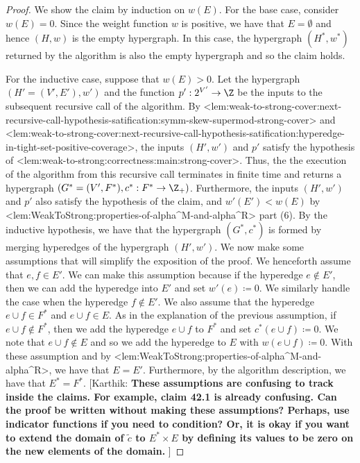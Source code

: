 \documentclass{article}
\def\Cref#1{<#1>}%
\newcommand{\knote}[1]{{\color{red}[{\tiny Karthik: \bf #1}]\marginpar{\color{red}*}}}
\begin{document}
\iffalse
\begin{proof}
    We show the claim by induction on $w(E)$. For the base case, consider $w(E) = 0$. Since the weight function $w$ is positive, we have that $E = \emptyset$ and hence $(H, w)$ is the empty hypergraph. In this case, the hypergraph $(H^*, w^*)$ returned by the algorithm is also the empty hypergraph and so the claim holds. 

    For the inductive case, suppose that $w(E) > 0$. Let the hypergraph $(H' = (V', E'), w')$ and the function $p':2^{V'}\rightarrow\Z$ be the inputs to the subsequent recursive call of the algorithm. By \Cref{lem:weak-to-strong-cover:next-recursive-call-hypothesis-satification:symm-skew-supermod-strong-cover} and \Cref{lem:weak-to-strong-cover:next-recursive-call-hypothesis-satification:hyperedge-in-tight-set-positive-coverage}, the inputs $(H',w')$ and $p'$ satisfy the hypothesis of \Cref{lem:weak-to-strong:correctness:main:strong-cover}. Thus, the the execution of the algorithm from this recursive call terminates in finite time and returns a hypergraph $(G^* = (V', F^*), c^*:F^*\rightarrow\Z_+)$. Furthermore, the inputs 
$(H', w')$ and $p'$ also satisfy the hypothesis of the claim, and $w'(E') < w(E)$ by \Cref{lem:WeakToStrong:properties-of-alpha^M-and-alpha^R} part (6). By the inductive hypothesis, we have that the hypergraph $(G^*, c^*)$ is formed by merging hyperedges of the hypergraph $(H', w')$. We now make some assumptions that will simplify the exposition of the proof. We henceforth assume that  $e, f \in E'$. We can make this assumption because if the hyperedge $e \not \in E'$, then we can add the hyperedge into $E'$ and set $w'(e) \coloneqq  0$. We similarly handle the case when the hyperedge $f \not \in E'$. We also assume that the hyperedge $e \cup f \in F^*$ and $e \cup f \in E$. As in the explanation of the previous assumption, if $e\cup f \not \in F^*$, then we add the hyperedge $e \cup f$ to $F^*$ and set $c^*(e\cup f) \coloneqq  0$. We note that $e\cup f \not \in E$ and so we add the hyperedge to $E$ with $w(e\cup f) \coloneqq  0$. With these assumption and by \Cref{lem:WeakToStrong:properties-of-alpha^M-and-alpha^R}, we have that $E = E'$. Furthermore, by the algorithm description, we have that  $E^* = F^*$. \knote{These assumptions are confusing to track inside the claims. For example, claim 42.1 is already confusing. Can the proof be written without making these assumptions? Perhaps, use indicator functions if you need to condition? Or, it is okay if you want to extend the domain of $\tilde{c}$ to $E^*\times E$ by defining its values to be zero on the new elements of the domain. }


\end{proof}
\end{document}
